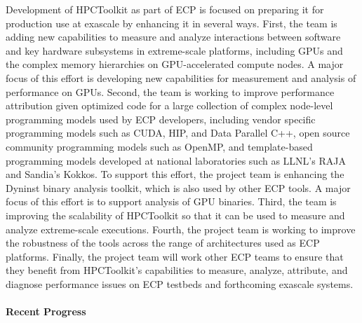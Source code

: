 Development of HPCToolkit as part of ECP is focused on preparing it
for production use at exascale by enhancing it in several ways. First,
the team is adding new capabilities to measure and analyze
interactions between software and key hardware subsystems in
extreme-scale platforms, including GPUs and the complex memory hierarchies on GPU-accelerated compute nodes. A major focus of this effort is developing new capabilities for 
measurement and analysis of performance on GPUs.
Second, the team is working to improve performance
attribution given optimized code for a large collection of complex node-level programming
models used by ECP developers, including 
vendor specific programming models such as CUDA, HIP, and Data Parallel C++,
open source community programming models such as OpenMP,
and template-based programming models developed at national laboratories such as LLNL's RAJA and Sandia's Kokkos. To support
this effort, the project team is enhancing the Dyninst binary analysis
toolkit, which is also used by other ECP tools. A major focus of this effort 
is to support analysis of GPU binaries. Third, the team is
improving the scalability of HPCToolkit so that it can be used to
measure and analyze extreme-scale executions. Fourth, the project team
is working to improve the robustness of the tools across the range of
architectures used as ECP platforms. Finally, the project team will
work other ECP teams to ensure that they benefit from HPCToolkit's
capabilities to measure, analyze, attribute, and diagnose performance
issues on ECP testbeds and forthcoming exascale systems.

\newpage
\paragraph{Recent Progress}

